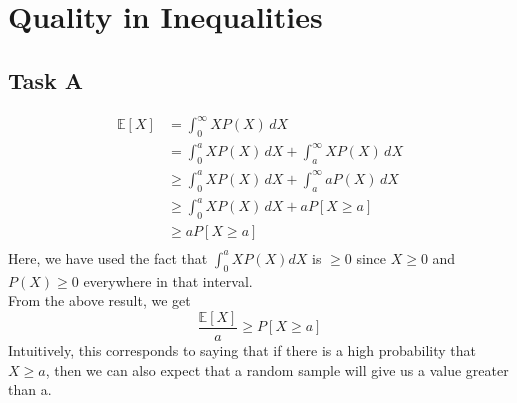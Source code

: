 \section{Quality in Inequalities}

\subsection{Task A}

\begin{align*}
    \mathbb{E}[X] & =\int_{0}^{\infty} X P(X) \, dX \\
    & =\int_{0}^a X P(X) \, dX + \int_{a}^{\infty} X P(X) \, dX \\
    & \ge \int_{0}^{a} X P(X) \, dX + \int_{a}^{\infty} a P(X) \, dX \\
    & \ge \int_{0}^{a} X P(X) \, dX + a P[X \ge a] \\
    & \ge a P[X \ge a] \\
\end{align*}
Here, we have used the fact that $\int_{0}^{a} X P(X) dX$ is $\ge 0$ since $X \ge 0$ and $P(X) \ge 0$ everywhere in that interval.\\
From the above result, we get
\[
    \frac{\mathbb{E}[X]}{a} \ge P[X \ge a]
\]
Intuitively, this corresponds to saying that if there is a high probability that $X \ge a$, then we can also expect that a random sample will give us a value greater than a.
